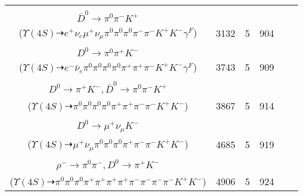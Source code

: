 \documentclass[landscape]{article}
\newcounter{rownumbers}
\newcommand\rn{\stepcounter{rownumbers}\arabic{rownumbers}}
\newcommand{\EOLP}{\\ \hline} %
\newcommand{\topoTags}[1]{#1} %
\begin{document}
\begin{longtable}{clcccc}
\rn & \makecell[l]{ $ 
\Upsilon(4S) \rightarrow B^{+} B^{-} ,
B^{+} \rightarrow e^{+} \nu_{e} \bar{D}^{*0} \gamma^{F} ,
B^{-} \rightarrow \rho^{-} D^{0} ,
\bar{D}^{*0} \rightarrow \pi^{0} \bar{D}^{0} ,
\rho^{-} \rightarrow \pi^{0} \pi^{-} ,
D^{0} \rightarrow \mu^{+} \nu_{\mu} K^{-} ,
$ \\ $
\bar{D}^{0} \rightarrow \pi^{0} \pi^{-} K^{+} 
$ \\ ($
\Upsilon(4S) \dashrightarrow e^{+} \nu_{e} \mu^{+} \nu_{\mu} \pi^{0} \pi^{0} \pi^{0} \pi^{-} \pi^{-} K^{+} K^{-} \gamma^{F} 
$) } & \topoTags{3132 & }5 & 904 \EOLP

\rn & \makecell[l]{ $ 
\Upsilon(4S) \rightarrow B^{+} B^{-} ,
B^{+} \rightarrow \rho^{+} \bar{D}^{0} ,
B^{-} \rightarrow e^{-} \bar{\nu}_{e} D^{*0} \gamma^{F} ,
\rho^{+} \rightarrow \pi^{0} \pi^{+} ,
\bar{D}^{0} \rightarrow \pi^{0} \pi^{-} K^{+} ,
D^{*0} \rightarrow \pi^{0} D^{0} ,
$ \\ $
D^{0} \rightarrow \pi^{0} \pi^{+} K^{-} 
$ \\ ($
\Upsilon(4S) \dashrightarrow e^{-} \bar{\nu}_{e} \pi^{0} \pi^{0} \pi^{0} \pi^{0} \pi^{+} \pi^{+} \pi^{-} K^{+} K^{-} \gamma^{F} 
$) } & \topoTags{3743 & }5 & 909 \EOLP

\rn & \makecell[l]{ $ 
\Upsilon(4S) \rightarrow B^{+} B^{-} ,
B^{+} \rightarrow \rho^{+} \bar{D}^{*0} ,
B^{-} \rightarrow \rho^{-} D^{0} ,
\rho^{+} \rightarrow \pi^{0} \pi^{+} ,
\bar{D}^{*0} \rightarrow \pi^{0} \bar{D}^{0} ,
\rho^{-} \rightarrow \pi^{0} \pi^{-} ,
$ \\ $
D^{0} \rightarrow \pi^{+} K^{-} ,
\bar{D}^{0} \rightarrow \pi^{0} \pi^{-} K^{+} 
$ \\ ($
\Upsilon(4S) \dashrightarrow \pi^{0} \pi^{0} \pi^{0} \pi^{0} \pi^{+} \pi^{+} \pi^{-} \pi^{-} K^{+} K^{-} 
$) } & \topoTags{3867 & }5 & 914 \EOLP

\rn & \makecell[l]{ $ 
\Upsilon(4S) \rightarrow B^{+} B^{-} ,
B^{+} \rightarrow \rho^{+} \bar{D}^{0} ,
B^{-} \rightarrow \rho^{-} D^{0} ,
\rho^{+} \rightarrow \pi^{0} \pi^{+} ,
\bar{D}^{0} \rightarrow \pi^{0} \pi^{-} K^{+} ,
\rho^{-} \rightarrow \pi^{0} \pi^{-} ,
$ \\ $
D^{0} \rightarrow \mu^{+} \nu_{\mu} K^{-} 
$ \\ ($
\Upsilon(4S) \dashrightarrow \mu^{+} \nu_{\mu} \pi^{0} \pi^{0} \pi^{0} \pi^{+} \pi^{-} \pi^{-} K^{+} K^{-} 
$) } & \topoTags{4685 & }5 & 919 \EOLP

\rn & \makecell[l]{ $ 
\Upsilon(4S) \rightarrow B^{+} B^{-} ,
B^{+} \rightarrow \rho^{0} \pi^{+} \omega \bar{D}^{0} ,
B^{-} \rightarrow \rho^{-} D^{0} ,
\rho^{0} \rightarrow \pi^{+} \pi^{-} ,
\omega \rightarrow \pi^{0} \pi^{+} \pi^{-} ,
\bar{D}^{0} \rightarrow \pi^{0} \pi^{-} K^{+} ,
$ \\ $
\rho^{-} \rightarrow \pi^{0} \pi^{-} ,
D^{0} \rightarrow \pi^{+} K^{-} 
$ \\ ($
\Upsilon(4S) \dashrightarrow \pi^{0} \pi^{0} \pi^{0} \pi^{+} \pi^{+} \pi^{+} \pi^{+} \pi^{-} \pi^{-} \pi^{-} \pi^{-} K^{+} K^{-} 
$) } & \topoTags{4906 & }5 & 924 \EOLP


\end{longtable}
\end{document}
